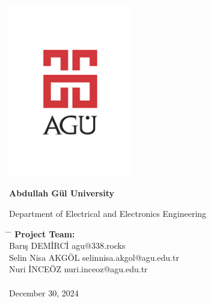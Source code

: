 \begin{center}
	\includegraphics[width=0.4\textwidth]{assets/agu.png}

	\Huge
	\textbf{Abdullah Gül University}
	
	\vspace{0.3cm}
	Department of Electrical and Electronics Engineering

	\vspace{1cm}
	\Huge
	\textbf{\paperTitle}

	\vspace{0.3cm}
	\Huge
	\paperSubTitle{}

	\vspace{0.8cm}
	\large
	\vspace{0.5cm}
	\LARGE
	\vspace{1.5cm}
	\textbf{}
	\vfill
	\vspace{0.8cm}
	\Large
\end{center}

\begin{tabbing}
	\hspace*{1em}\= \hspace*{9em} \= \kill
	\> \textbf{Project Team:} \>  \\
	\> Barış DEMİRCİ \> agu@338.rocks \\
	\> Selin Nisa AKGÖL \> selinnisa.akgol@agu.edu.tr \\
	\> Nuri İNCEÖZ \> nuri.inceoz@agu.edu.tr \\
	\>  \\
	\> December 30, 2024 \\
\end{tabbing}
